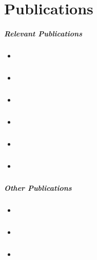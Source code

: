 \chapter{Publications} 

\paragraph{Relevant Publications}

\begin{itemize}
  \item \cite{KieferM14b} 
  \item \cite{KieferM14a} 
  \item \cite{DongK15a} 
  \item \cite{KieferM15a} 
  \item \cite{KieferM15b} 
  \item \cite{KieferM15c} 
\end{itemize}

\paragraph{Other Publications}

\begin{itemize}
  \item \cite{FGKMP2013} 
  \item \cite{BHK2013} 
  \item \cite{opake} 
\end{itemize}
